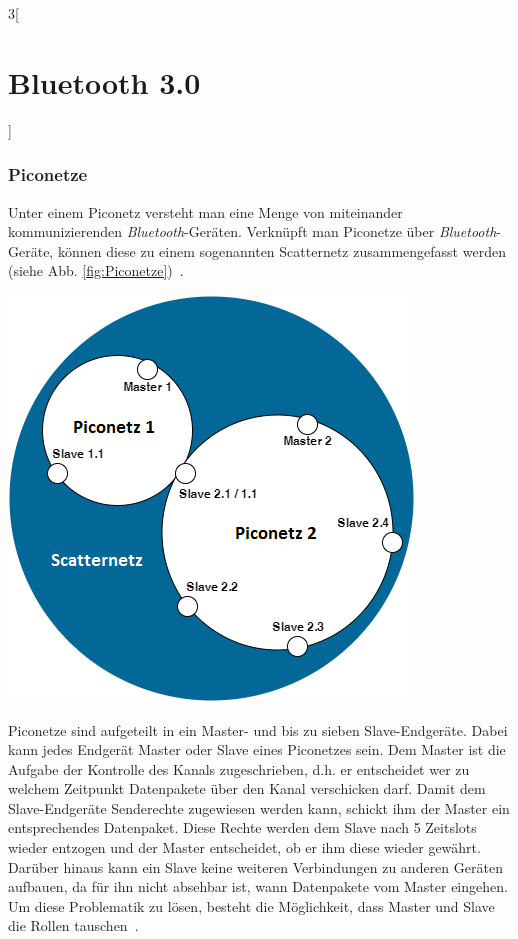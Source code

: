 \begin{multicols}{3}[\section{Bluetooth 3.0}]
\subsubsection*{Piconetze}
Unter einem Piconetz versteht man eine Menge von miteinander kommunizierenden \textit{Bluetooth}-Geräten. Verknüpft man Piconetze über \textit{Bluetooth}-Geräte, können diese zu einem sogenannten Scatternetz zusammengefasst werden (siehe Abb. \ref{fig:Piconetze})~\cite{bluetooth3.0.3}.

\begin{Figure}
\begin{center}
\includegraphics[scale=0.4]{Kapitel/Bluetooth3.0/Grafiken/piconetze.png}
\end{center}
\label{fig:Piconetze}
\end{Figure}

\noindent
Piconetze sind aufgeteilt in ein Master- und bis zu sieben Slave-Endgeräte. Dabei kann jedes Endgerät Master oder Slave eines Piconetzes sein. Dem Master ist die Aufgabe der Kontrolle des Kanals zugeschrieben, d.h. er entscheidet wer zu welchem Zeitpunkt Datenpakete über den Kanal verschicken darf. Damit dem Slave-Endgeräte Senderechte zugewiesen werden kann, schickt ihm der Master ein entsprechendes Datenpaket. Diese Rechte werden dem Slave nach 5 Zeitslots wieder entzogen und der Master entscheidet, ob er ihm diese wieder gewährt. Darüber hinaus kann ein Slave keine weiteren Verbindungen zu anderen Geräten aufbauen, da für ihn nicht absehbar ist, wann Datenpakete vom Master eingehen. Um diese Problematik zu lösen, besteht die Möglichkeit, dass Master und Slave die Rollen tauschen~\cite{bluetooth3.0.1}.


\end{multicols}
